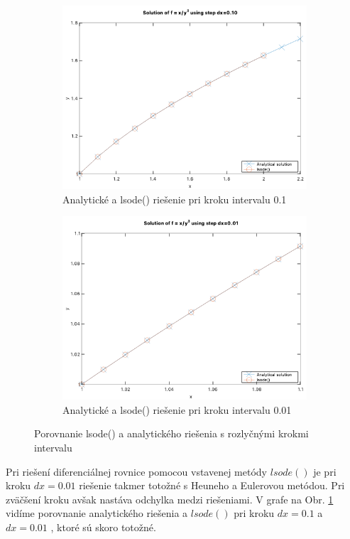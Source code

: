 \documentclass{article}
\theoremstyle{definition}
\theoremstyle{remark}
\begin{document}
\begin{figure}[H]
  \centering
  \begin{subfigure}[b]{0.49\textwidth}
    \includegraphics[width=\textwidth]{hw1_grp3.png}
    \caption{Analytické a lsode() riešenie pri kroku intervalu 0.1} 
    
  \end{subfigure}
  \hfill
  \begin{subfigure}[b]{0.49\textwidth}
    \includegraphics[width=\textwidth]{analytical_pre.png}
    \caption{Analytické a lsode() riešenie pri kroku intervalu 0.01}
  \end{subfigure}
  \caption{Porovnanie lsode() a analytického riešenia s rozlyčnými krokmi intervalu}
  \label{fig:analyticallsode}
\end{figure}
Pri riešení diferenciálnej rovnice pomocou vstavenej metódy $lsode()$ je pri kroku $dx=0.01$ riešenie takmer totožné s Heuneho a Eulerovou metódou. Pri zväčšení kroku avšak nastáva odchylka medzi riešeniami. V grafe na Obr. \ref{fig:analyticallsode} vidíme porovnanie analytického riešenia a $lsode()$ pri kroku $dx=0.1$ a $dx=0.01$ , ktoré sú skoro totožné.
\end{document}
